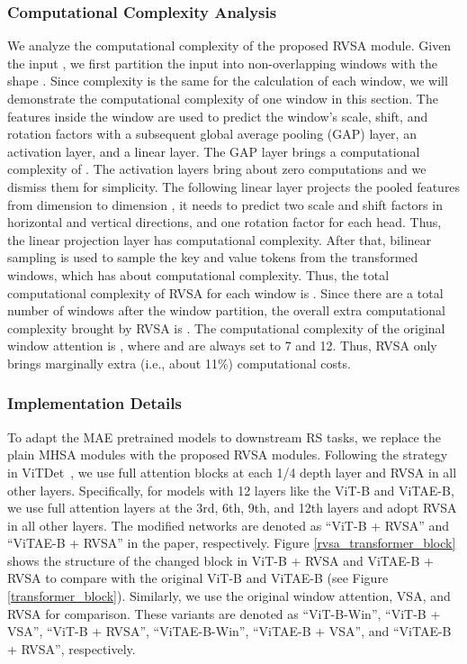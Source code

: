\documentclass[10pt, journal,twoside]{IEEEtran}
\begin{document}
\subsubsection{Computational Complexity Analysis} We analyze the computational complexity of the proposed RVSA module. Given the input , we first partition the input into non-overlapping windows with the shape . Since complexity is the same for the calculation of each window, we will demonstrate the computational complexity of one window in this section. The features inside the window are used to predict the window's scale, shift, and rotation factors with a subsequent global average pooling (GAP) layer, an activation layer, and a linear layer. The GAP layer brings a computational complexity of . The activation layers bring about zero computations and we dismiss them for simplicity. The following linear layer projects the pooled features from dimension  to dimension , it needs to predict two scale and shift factors in horizontal and vertical directions, and one rotation factor for each head. Thus, the linear projection layer has  computational complexity. After that, bilinear sampling is used to sample the key and value tokens from the transformed windows, which has about  computational complexity. Thus, the total computational complexity of RVSA for each window is . Since there are a total number of  windows after the window partition, the overall extra computational complexity brought by RVSA is . The computational complexity of the original window attention is , where  and  are always set to 7 and 12. Thus, RVSA only brings marginally extra (i.e., about 11\%) computational costs.


\subsubsection{Implementation Details}
To adapt the MAE pretrained models to downstream RS tasks, we replace the plain MHSA modules with the proposed RVSA modules. Following the strategy in ViTDet~\cite{vitdet}, we use full attention blocks at each 1/4 depth layer and RVSA in all other layers. Specifically, for models with 12 layers like the ViT-B and ViTAE-B, we use full attention layers at the 3rd, 6th, 9th, and 12th layers and adopt RVSA in all other layers. The modified networks are denoted as ``ViT-B + RVSA'' and ``ViTAE-B + RVSA'' in the paper, respectively. Figure \ref{rvsa_transformer_block} shows the structure of the changed block in ViT-B + RVSA and ViTAE-B + RVSA to compare with the original ViT-B and ViTAE-B (see Figure \ref{transformer_block}). Similarly, we use the original window attention, VSA, and RVSA for comparison. These variants are denoted as ``ViT-B-Win'', ``ViT-B + VSA'', ``ViT-B + RVSA'', ``ViTAE-B-Win'', ``ViTAE-B + VSA'', and ``ViTAE-B + RVSA'', respectively.
\end{document}
